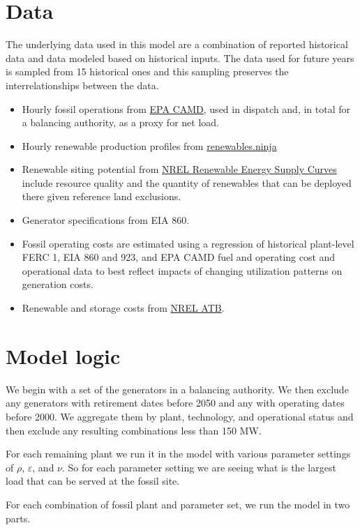 \documentclass[9pt, oneside]{article}
\numberwithin{equation}{subsubsection}
\begin{document}
\section{Data}\label{sec:data}
The underlying data used in this model are a combination of reported historical data
and data modeled based on historical inputs. The data used for future years is sampled
from 15 historical ones and this sampling preserves the interrelationships between the
data.
\begin{itemize}
	\item Hourly fossil operations from \href{https://campd.epa.gov}{EPA CAMD}, used in dispatch and, in total
	      for a balancing authority, as a proxy for net load.
	\item Hourly renewable production profiles from \href{https://www.renewables.ninja}{renewables.ninja}
	\item Renewable siting potential from \href{https://www.nrel.gov/gis/renewable-energy-supply-curves.html}{NREL Renewable Energy Supply Curves} include resource quality and the quantity of renewables that can be deployed there given reference land exclusions.
	\item Generator specifications from EIA 860.
	\item Fossil operating costs are estimated using a regression of historical plant-level
	      FERC 1, EIA 860 and 923, and EPA CAMD fuel and operating cost and operational data to
	      best reflect impacts of changing utilization patterns on generation costs.
	\item Renewable and storage costs from \href{https://atb.nrel.gov/electricity/2024/data}{NREL ATB}.
\end{itemize}

\section{Model logic}\label{sec:model-logic}
We begin with a set of the generators in a balancing authority. We then exclude any generators with retirement dates
before 2050 and any with operating dates before 2000. We aggregate them by plant, technology, and operational status
and then exclude any resulting combinations less than 150 MW.

For each remaining plant we run it in the model with various parameter settings of $\rho$,
$\varepsilon$, and $\nu$. So for each parameter setting we are
seeing what is the largest load that can be served at the fossil site.

For each combination of fossil plant and parameter set, we run the
model in two parts.
\end{document}
